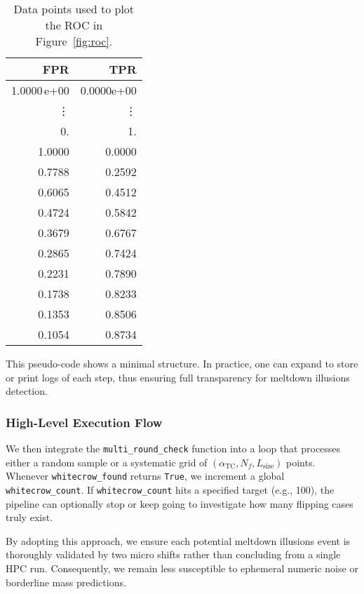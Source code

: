 \documentclass[11pt]{article}
\begin{document}
\begin{table}[ht]
  \centering
  \small
  \begin{tabular}{rr}
    \toprule
    FPR & TPR \\
    \midrule
    1.0000\,e+00 & 0.0000e+00 \\ %
    \vdots & \vdots \\
    0. & 1. \\ %
    \midrule
    1.0000 & 0.0000 \\
    0.7788 & 0.2592 \\
    0.6065 & 0.4512 \\
    0.4724 & 0.5842 \\
    0.3679 & 0.6767 \\
    0.2865 & 0.7424 \\
    0.2231 & 0.7890 \\
    0.1738 & 0.8233 \\
    0.1353 & 0.8506 \\
    0.1054 & 0.8734 \\
    \bottomrule
  \end{tabular}
  \caption{Data points used to plot the ROC in Figure~\ref{fig:roc}.}
  \label{tab:rocdata}
\end{table}


This pseudo-code shows a minimal structure.
In practice, one can expand to store or print logs of each step,
thus ensuring full transparency for meltdown illusions detection.

\subsubsection{High-Level Execution Flow}

We then integrate the \texttt{multi\_round\_check} function
into a loop that processes either a random sample or a systematic grid 
of $(\alpha_{\mathrm{TC}}, N_f, L_{\mathrm{size}})$ points. 
Whenever \texttt{whitecrow\_found} returns \texttt{True}, 
we increment a global \texttt{whitecrow\_count}.
If \texttt{whitecrow\_count} hits a specified target (e.g., 100),
the pipeline can optionally stop or keep going 
to investigate how many flipping cases truly exist.

By adopting this approach, we ensure each potential meltdown illusions event 
is thoroughly validated by two micro shifts 
rather than concluding from a single HPC run. 
Consequently, we remain less susceptible 
to ephemeral numeric noise or borderline mass predictions.
\end{document}
